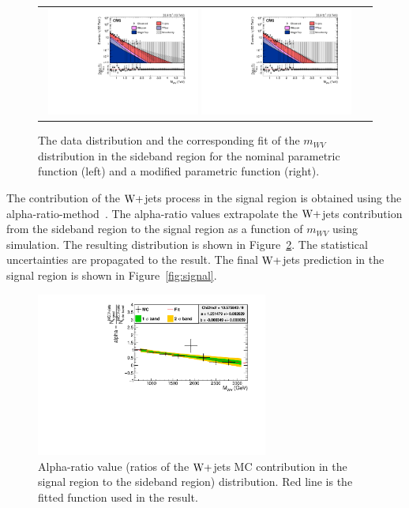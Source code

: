 \begin{figure}[!htbp] 
	 \centering 
	 \begin{tabular}{cc}
	 \includegraphics[width=0.48\textwidth]{Plots/BackgroundEstimation/WV/m_lvj_fitting/m_lvj_sb_lo_WJets0_xww__with_pull_log.pdf}
	 \includegraphics[width=0.48\textwidth]{Plots/BackgroundEstimation/WV/m_lvj_fitting/m_lvj_sb_lo_WJets01_xww__with_pull_log.pdf} 
	 \end{tabular}
	 \caption{The data distribution and the corresponding fit of the $m_{WV}$ distribution in the sideband region for the nominal parametric function (left) and a modified parametric function (right).}
	 \label{fig:DataMCForMWW}
\end{figure}

 The contribution of the $\mathrm{W}+$jets process in the signal region is obtained using the alpha-ratio-method~\cite{Gunion1986,resonances,cmsnote}. The alpha-ratio values extrapolate the $\mathrm{W}+$jets contribution from the sideband region to the signal region as a function of $m_{WV}$ using simulation. The resulting distribution is shown in Figure~\ref{fig:AlphaDis}. The statistical uncertainties are propagated to the result. The final $\mathrm{W}+$jets prediction in the signal region is shown in Figure~\ref{fig:signal}. 

\begin{figure}[!htbp] 
	 \centering 
	 \includegraphics[width=0.68\textwidth]{Plots/BackgroundEstimation/WV/WVchannel_AlphaDistribution_AfterFit_New2.pdf}
	 \caption{Alpha-ratio value (ratios of the $\mathrm{W}+$jets MC contribution in the signal region to the sideband region) distribution. Red line is the fitted function used in the result.}
	 \label{fig:AlphaDis}
\end{figure}

